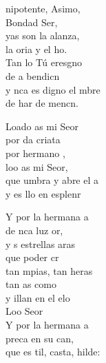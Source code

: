 \begin{cancion}%
	nipotente, Asimo, \\
	Bondad Ser,\\
	yas son la alanza, \\
	la oria y el ho.\\
	Tan lo Tú eresgno \\
	de a bendicn\\
	y nca es digno el mbre\\
	de har de mencn.\jump\\
	\begin{chorus}%
		Loado as mi Seor\\
		por da criata\\
		por  hermano ,\\
		loo as mi Seor,\\
		que umbra y abre el a\\
		y es llo en esplenr\jump\\
	\end{chorus}%
	Y por la hermana a\\
	de nca luz or,\\
	y s estrellas aras \\
	que  poder cr \\
	tan mpias, tan heras\\
	tan as como  \\
	y illan en el elo\\
	Loo Seor\\
	\jump
	Y por la hermana a \\
	preca en su can,\\
	que es til, casta, hilde: \\

\end{cancion}
